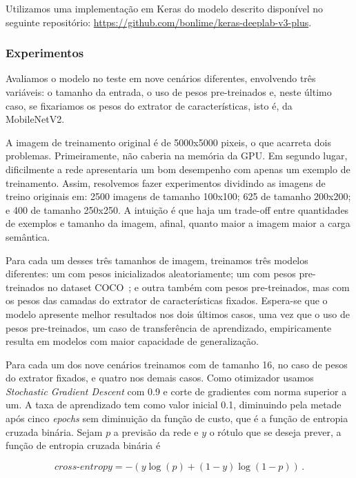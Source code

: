 \documentclass{bmvc2k}
\begin{document}
Utilizamos uma implementação em Keras do modelo descrito disponível no seguinte repositório: \url{https://github.com/bonlime/keras-deeplab-v3-plus}.

\subsubsection{Experimentos}
Avaliamos o modelo no teste em nove cenários diferentes, envolvendo três variáveis: o tamanho da entrada, o uso de pesos pre-treinados e, neste último caso, se fixariamos os pesos do extrator de características, isto é, da MobileNetV2.

A imagem de treinamento original é de 5000x5000 pixeis, o que acarreta dois problemas. Primeiramente, não caberia na memória da GPU. Em segundo lugar, dificilmente a rede apresentaria um bom desempenho com apenas um exemplo de treinamento. Assim, resolvemos fazer experimentos dividindo as imagens de treino originais em: 2500 imagens de tamanho 100x100; 625 de tamanho 200x200; e 400 de tamanho 250x250. A intuição é que haja um trade-off entre quantidades de exemplos e tamanho da imagem, afinal, quanto maior a imagem maior a carga semântica.

Para cada um desses três tamanhos de imagem, treinamos três modelos diferentes: um com pesos inicializados aleatoriamente; um com pesos pre-treinados no dataset COCO~\cite{coco}; e outra também com pesos pre-treinados, mas com os pesos das camadas do extrator de características fixados. Espera-se que o modelo apresente melhor resultados nos dois últimos casos, uma vez que o uso de pesos pre-treinados, um caso de transferência de aprendizado, empiricamente resulta em modelos com maior capacidade de generalização.

Para cada um dos nove cenários treinamos com  de tamanho 16, no caso de pesos do extrator fixados, e quatro nos demais casos. Como otimizador usamos \textit{Stochastic Gradient Descent} com  0.9 e corte de gradientes com norma superior a um. A taxa de aprendizado tem como valor inicial 0.1, diminuindo pela metade após cinco \textit{epochs} sem diminuição da função de custo, que é a função de entropia cruzada binária. Sejam $p$ a previsão da rede e $y$ o rótulo que se deseja prever, a função de entropia cruzada binária é

\begin{equation}
    \textit{cross-entropy} = -{(y\log(p) + (1 - y)\log(1 - p))}\,.
\end{equation}
\end{document}
